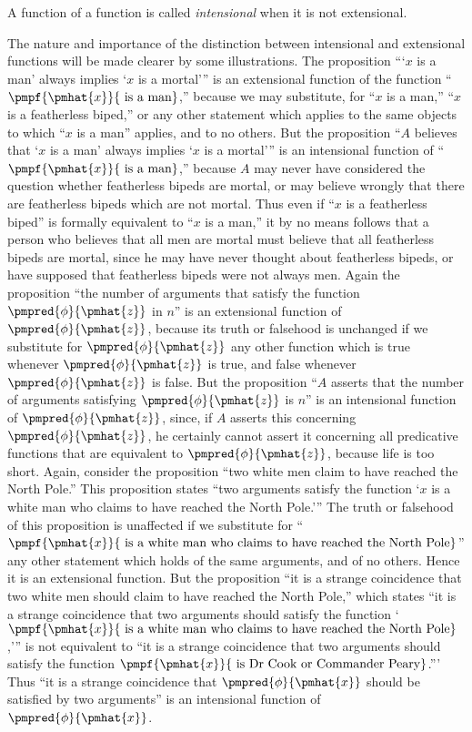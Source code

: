 \documentclass[letterpaper,12pt,openany,leqno]{book}
\newcommand{\pagefirst}[1]{\marginnote[\boxed{\text{#1}}]{\boxed{\text{#1}}}}
\begin{document}
A function of a function is called \textit{intensional} when it is not extensional.

The nature and importance of the distinction between intensional and extensional functions will be made clearer by some illustrations. The proposition ```$x$ is a man' always implies `$x$ is a mortal''' is an extensional function of the function ``$\pmpf{\pmhat{x}}{\text{ is a man}}$,'' because we may substitute, for ``$x$ is a man,'' ``$x$ is a featherless biped,'' or any other statement which applies to the same objects to which ``$x$ is a man'' applies, and to no others. But the proposition ``$A$ believes that `$x$ is a man' always implies `$x$ is a mortal''' is an intensional function of ``$\pmpf{\pmhat{x}}{\text{ is a man}}$,'' because $A$ may never have considered the question whether featherless bipeds are mortal, or may believe wrongly that there are featherless bipeds which are not mortal. Thus even if ``$x$ is a featherless biped'' is formally equivalent to ``$x$ is a man,'' it by no means follows that a person who believes that all men are mortal must believe that all featherless bipeds are mortal, since he may have never thought about featherless bipeds, or have supposed that featherless bipeds were not always men. Again the proposition ``the number of arguments that satisfy the function $\pmpred{\phi}{\pmhat{z}}$ in $n$'' is an extensional function of $\pmpred{\phi}{\pmhat{z}}$, because its truth or falsehood is unchanged if we substitute for $\pmpred{\phi}{\pmhat{z}}$ any other function which is true whenever $\pmpred{\phi}{\pmhat{z}}$ is true, and false whenever $\pmpred{\phi}{\pmhat{z}}$ is false. But the proposition ``$A$ asserts that the number of arguments satisfying $\pmpred{\phi}{\pmhat{z}}$ is $n$'' is an intensional function of $\pmpred{\phi}{\pmhat{z}}$, \pagefirst{77} since, if $A$ asserts this concerning $\pmpred{\phi}{\pmhat{z}}$, he certainly cannot assert it concerning all predicative functions that are equivalent to $\pmpred{\phi}{\pmhat{z}}$, because life is too short. Again, consider the proposition ``two white men claim to have reached the North Pole.'' This proposition states ``two arguments satisfy the function `$x$ is a white man who claims to have reached the North Pole.''' The truth or falsehood of this proposition is unaffected if we substitute for ``$\pmpf{\pmhat{x}}{\text{ is a white man who claims to have reached the North Pole}}$'' any other statement which holds of the same arguments, and of no others. Hence it is an extensional function. But the proposition ``it is a strange coincidence that two white men should claim to have reached the North Pole,'' which states ``it is a strange coincidence that two arguments should satisfy the function `$\pmpf{\pmhat{x}}{\text{ is a white man who claims to have reached the North Pole}}$,''' is not equivalent to ``it is a strange coincidence that two arguments should satisfy the function $\pmpf{\pmhat{x}}{\text{ is Dr Cook or Commander Peary}}$.''' Thus ``it is a strange coincidence that $\pmpred{\phi}{\pmhat{x}}$ should be satisfied by two arguments'' is an intensional function of $\pmpred{\phi}{\pmhat{x}}$.
\end{document}
